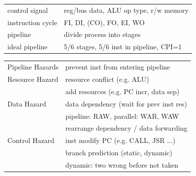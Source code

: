 \documentclass[10pt]{article}
\begin{document}
\begin{multicols*}{2}
    \begin{tcolorbox}[title=Processor]
        \begin{tabular}{ll}
            control signal    & reg/bus data, ALU op type, r/w memory   \\
            instruction cycle & FI, DI, (CO), FO, EI, WO                \\
            pipeline          & divide process into stages              \\
            ideal pipeline    & 5/6 stages, 5/6 inst in pipeline, CPI=1 \\
            \hline
        \end{tabular}
        \begin{tabular}{p{75pt}p{180pt}}
            Pipeline Hazards & prevent inst from entering pipeline      \\
            Resource Hazard  & resource conflict (e.g. ALU)             \\
            ~                & add resources (e.g. PC incr, data sep)   \\
            Data Hazard      & data dependency (wait for prev inst res) \\
            ~                & pipeline: RAW, parallel: WAR, WAW        \\
            ~                & rearrange dependency / data forwarding   \\
            Control Hazard   & inst modify PC (e.g. CALL, JSR ...)      \\
            ~                & branch prediction (static, dynamic)      \\
            ~                & dynamic: two wrong before not taken      \\
            \hline
        \end{tabular}


\end{tcolorbox}
\end{multicols*}
\end{document}
